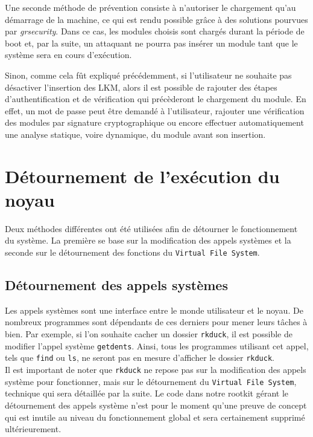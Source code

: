 \documentclass[12pt]{article}
\begin{document}
        Une seconde méthode de prévention consiste à n'autoriser le chargement qu'au démarrage de la machine, ce qui est rendu possible grâce à des solutions pourvues par \textit{grsecurity}. Dans ce cas, les modules choisis sont chargés durant la période de boot et, par la suite, un attaquant ne pourra pas insérer un module tant que le système sera en cours d'exécution.

        Sinon, comme cela fût expliqué précédemment, si l'utilisateur ne souhaite pas désactiver l'insertion des LKM, alors il est possible de rajouter des étapes d'authentification et de vérification qui précèderont le chargement du module. En effet, un mot de passe peut être demandé à l'utilisateur, rajouter une vérification des modules par signature cryptographique ou encore effectuer automatiquement une analyse statique, voire dynamique, du module avant son insertion.
    
\section{Détournement de l'exécution du noyau}  

Deux méthodes différentes ont été utilisées afin de détourner le fonctionnement du système. La première se base sur la modification des appels systèmes et la seconde sur le détournement des fonctions du \texttt{Virtual File System}.

    \subsection{Détournement des appels systèmes}
    
        Les appels systèmes sont une interface entre le monde utilisateur et le noyau. De nombreux programmes sont dépendants de ces derniers pour mener leurs tâches à bien. Par exemple, si l'on souhaite cacher un dossier \texttt{rkduck}, il est possible de modifier l'appel système \texttt{getdents}. Ainsi, tous les programmes utilisant cet appel, tels que \texttt{find} ou \texttt{ls}, ne seront pas en mesure d'afficher le dossier \texttt{rkduck}.\\

        Il est important de noter que \texttt{rkduck} ne repose pas sur la modification des appels système pour fonctionner, mais sur le détournement du \texttt{Virtual File System}, technique qui sera détaillée par la suite. Le code dans notre rootkit gérant le détournement des appels système n'est pour le moment qu'une preuve de concept qui est inutile au niveau du fonctionnement global et sera certainement supprimé ultérieurement. \\
\end{document}
